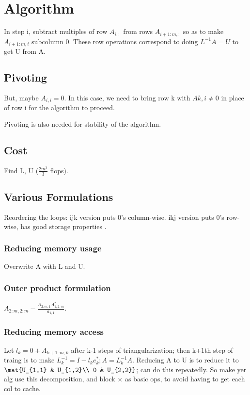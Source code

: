 \documentclass[oneside, article]{memoir}
\begin{document}
\section{Algorithm}
In step i, subtract multiples of row $A_{i,:}$ from rows $A_{i+1:m,:}$ so as to make $A_{i+1:m, i}$ subcolumn 0. These row operations correspond to doing $L^{-1}A = U$ to get U from A.

\subsection{Pivoting}
But, maybe $A_{i,i} = 0$. In this case, we need to bring row k with $A{k,i} \neq0$ in place of row i for the algorithm to proceed.

Pivoting is also needed for stability of the algorithm.

\subsection{Cost}
Find L, U ($\frac{2m^{3}}{3}$ flops).

\subsection{Various Formulations}
Reordering the loops: ijk version puts 0's column-wise. ikj version puts 0's row-wise, has good storage properties \why.

\subsubsection{Reducing memory usage}
Overwrite A with L and U.

\subsubsection{Outer product formulation}
$A_{2:m,2:m}-\frac{A_{2:m,1}A_{1,2:m}^{*}}{a_{1,1}}$.

\subsubsection{Reducing memory access}
Let $l_{k} = 0+A_{k+1:m,k}$ after k-1 steps of triangularization; then k+1th step of traing is to make $L^{-1}_{k} = I-l_{k}e_{k}^{*}; A=L^{-1}_{k}A$. Reducing A to U is to reduce it to $\mat{U_{1,1} & U_{1,2}\\ 0 & U_{2,2}}$; can do this repeatedly. So make yer alg use this decomposition, and block $\times$ as basic ops, to avoid having to get each col to cache.
\end{document}
